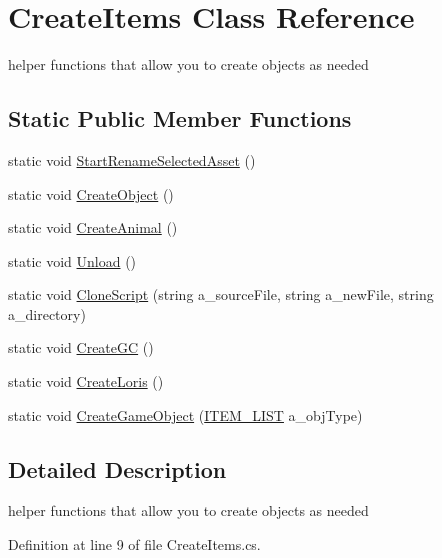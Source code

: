 \hypertarget{class_create_items}{}\section{Create\+Items Class Reference}
\label{class_create_items}


helper functions that allow you to create objects as needed  


\subsection*{Static Public Member Functions}
\begin{DoxyCompactItemize}
\item 
static void \mbox{\hyperlink{class_create_items_a35529e501074aba3e975b5916ebecfb0}{Start\+Rename\+Selected\+Asset}} ()
\item 
static void \mbox{\hyperlink{class_create_items_ae50469b06b617df7a2ff54c9840aa3ed}{Create\+Object}} ()
\item 
static void \mbox{\hyperlink{class_create_items_aa1e66423bdf3a3da33f8b7d8b32cc7b9}{Create\+Animal}} ()
\item 
static void \mbox{\hyperlink{class_create_items_a6284bdda80be5f13463fdb7c79880a70}{Unload}} ()
\item 
static void \mbox{\hyperlink{class_create_items_a046eeb575a0946230f48a9c8da08f798}{Clone\+Script}} (string a\+\_\+source\+File, string a\+\_\+new\+File, string a\+\_\+directory)
\item 
static void \mbox{\hyperlink{class_create_items_a3d2d7a5cbd211610c41fbd36a9c72ca7}{Create\+GC}} ()
\item 
static void \mbox{\hyperlink{class_create_items_a1d06452ba2bc5b041094933c3bd9e3e8}{Create\+Loris}} ()
\item 
static void \mbox{\hyperlink{class_create_items_a860a974651471d89a5b9f72bc00fd4b6}{Create\+Game\+Object}} (\mbox{\hyperlink{_items_8cs_a164ce1816b00d8986382120a0de4a1f3}{I\+T\+E\+M\+\_\+\+L\+I\+ST}} a\+\_\+obj\+Type)
\end{DoxyCompactItemize}


\subsection{Detailed Description}
helper functions that allow you to create objects as needed 



Definition at line 9 of file Create\+Items.\+cs.



